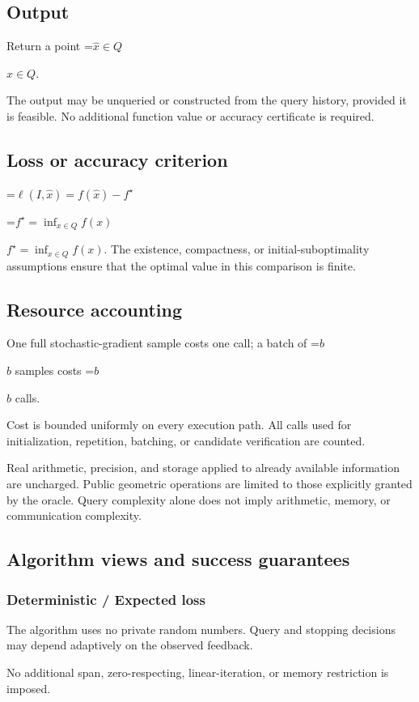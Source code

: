 \documentclass[10pt,a4paper]{article}
\newcommand{\AtlasMath}[1]{\par\begingroup\centering\setbox0=\hbox{$\displaystyle #1$}\ifdim\wd0>1.4\linewidth\typeout{ATLAS WIDE FORMULA: \the\wd0}\fi\ifdim\wd0>\linewidth\resizebox{\linewidth}{!}{\box0}\else\box0\fi\par\endgroup}
\newcommand{\AtlasInlineMath}[1]{\begingroup\setbox0=\hbox{$#1$}\ifdim\wd0>.4\linewidth\endgroup\AtlasMath{#1}\else\endgroup$#1$\fi}
\begin{document}
\subsection{Output}
Return a point \AtlasInlineMath{\widehat x\in Q}.

The output may be unqueried or constructed from the query history, provided it is feasible. No additional function value or accuracy certificate is required.

\subsection{Loss or accuracy criterion}

\AtlasMath{\ell(I,\widehat{x})=f(\widehat{x})-f^\star}


\AtlasInlineMath{f^\star=\inf_{x\in Q}f(x)}. The existence, compactness, or initial-suboptimality assumptions ensure that the optimal value in this comparison is finite.

\subsection{Resource accounting}
One full stochastic-gradient sample costs one call; a batch of \AtlasInlineMath{b} samples costs \AtlasInlineMath{b} calls.

Cost is bounded uniformly on every execution path. All calls used for initialization, repetition, batching, or candidate verification are counted.

Real arithmetic, precision, and storage applied to already available information are uncharged. Public geometric operations are limited to those explicitly granted by the oracle. Query complexity alone does not imply arithmetic, memory, or communication complexity.

\subsection{Algorithm views and success guarantees}
\subsubsection{Deterministic / Expected loss}
The algorithm uses no private random numbers. Query and stopping decisions may depend adaptively on the observed feedback.

No additional span, zero-respecting, linear-iteration, or memory restriction is imposed.
\end{document}
